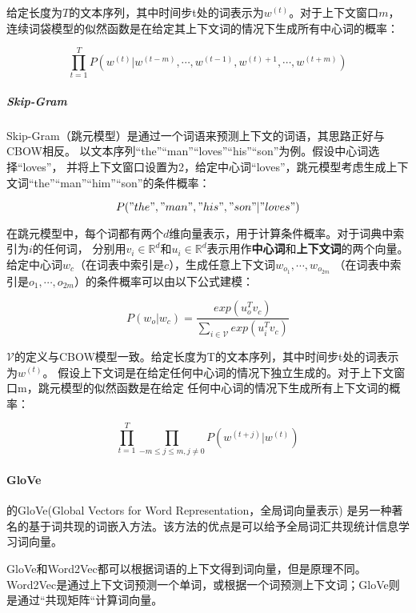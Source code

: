 给定长度为$T$的文本序列，其中时间步t处的词表示为$w^{(t)}$。对于上下文窗口$m$，
连续词袋模型的似然函数是在给定其上下文词的情况下生成所有中心词的概率：

\begin{equation}
    \prod_{t=1}^{T} P(w^{(t)}|w^{(t-m)}, \cdots, w^{(t-1)}, w^{(t)+1}, \cdots, w^{(t+m)})
\end{equation}


\subparagraph{Skip-Gram}
Skip-Gram（跳元模型）是通过一个词语来预测上下文的词语，其思路正好与CBOW相反。
以文本序列“the”“man”“loves”“his”“son”为例。假设中心词选择“loves”，
并将上下文窗口设置为2，给定中心词“loves”，跳元模型考虑生成上下文词“the”“man”“him”“son”的条件概率：

\begin{equation}
    P("the", "man", "his", "son"|"loves")
\end{equation}

在跳元模型中，每个词都有两个$d$维向量表示，用于计算条件概率。对于词典中索引为$i$的任何词，
分别用$v_i \in \mathbb{R}^d$和$u_i \in \mathbb{R}^d$表示用作\textbf{中心词}和\textbf{上下文词}的两个向量。
给定中心词$w_c$（在词表中索引是$c$），生成任意上下文词$w_{o_1}, \cdots, w_{o_{2m}}$
（在词表中索引是$o_1, \cdots, o_{2m}$）的条件概率可以由以下公式建模：

\begin{equation}
    P(w_o|w_c)
    = \frac{exp\left(u^T_o v_c \right)}
    {\sum_{i \in \mathcal{V}} exp\left( u^T_i v_c \right)}
\end{equation}

$\mathcal{V}$的定义与CBOW模型一致。给定长度为T的文本序列，其中时间步t处的词表示为$w^{(t)}$。
假设上下文词是在给定任何中心词的情况下独立生成的。对于上下文窗口m，跳元模型的似然函数是在给定
任何中心词的情况下生成所有上下文词的概率：

\begin{equation}
    \prod_{t=1}^{T} \prod_{-m \leq j \leq m, j \neq 0} P(w^{(t+j)} | w^{(t)})
\end{equation}



\paragraph{GloVe}

\parencite{pennington2014glove}的GloVe(Global Vectors for Word Representation，全局词向量表示)
是另一种著名的基于词共现的词嵌入方法。该方法的优点是可以给予全局词汇共现统计信息学习词向量。

GloVe和Word2Vec都可以根据词语的上下文得到词向量，但是原理不同。
Word2Vec是通过上下文词预测一个单词，或根据一个词预测上下文词；GloVe则是通过“共现矩阵“计算词向量。


